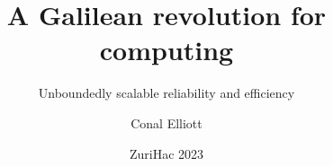 \nc{}
\nc{}

\nc{}
\nc{}


\author{Conal Elliott}
\title{A Galilean revolution for computing}
\subtitle{Unboundedly scalable reliability and efficiency}
\date{ZuriHac 2023}
